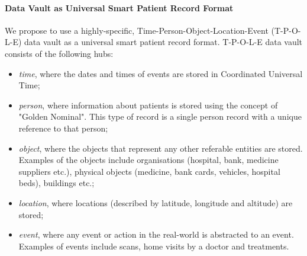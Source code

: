 \noindent
\paragraph{Data Vault as Universal Smart Patient Record Format} We propose to use a highly-specific, Time-Person-Object-Location-Event (T-P-O-L-E) data vault as a universal smart patient record format. T-P-O-L-E data vault consists of the following hubs:
\begin{itemize}
    \item \emph{time}, where the dates and times of events are stored in Coordinated Universal Time;
    \item \emph{person}, where  information  about  patients  is  stored  using  the  concept of "Golden Nominal".  This type of record is a single person record with a unique reference to that person;
    \item \emph{object}, where the objects that represent any other referable entities are stored. Examples of the objects include organisations (hospital, bank, medicine suppliers etc.), physical objects (medicine, bank cards, vehicles, hospital beds), buildings etc.; 
    \item \emph{location}, where locations (described by latitude, longitude and altitude) are stored;
    \item \emph{event}, where any event or action in the real-world is abstracted to an event. Examples of events include scans, home visits by a doctor and treatments. 
\end{itemize}




